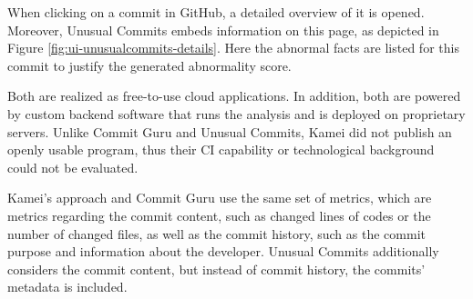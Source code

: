 When clicking on a commit in GitHub, a detailed overview of it is opened. Moreover, Unusual Commits embeds information on this page, as depicted in Figure \ref{fig:ui-unusualcommits-details}. Here the abnormal facts are listed for this commit to justify the generated abnormality score.

Both are realized as free-to-use cloud applications. In addition, both are powered by custom backend software that runs the analysis and is deployed on proprietary servers. %
Unlike Commit Guru and Unusual Commits, Kamei did not publish an openly usable program, thus their CI capability or technological background could not be evaluated.

Kamei's approach and Commit Guru use the same set of metrics, which are metrics regarding the commit content, such as changed lines of codes or the number of changed files, as well as the commit history, such as the commit purpose and information about the developer. Unusual Commits additionally considers the commit content, but instead of commit history, the commits' metadata is included.

